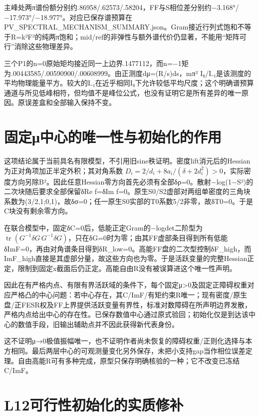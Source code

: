 \documentclass[
  10pt,
  a4paper,
]{article}
\begin{document}
主峰处两π谱份额分别约.86958/.62573/.58204，FF与S相位差分别约−3.168°/−17.973°/−18.977°。对应已保存谱预算在PV\_SPECTRAL\_MECHANISM\_SUMMARY.json。Gram接近行列式饱和不等于R=k²\textbar F\textbar²的纯两π饱和；mid/ref的非弹性与额外谱代价仍显著，不能用``矩阵可行''消除这些物理差异。

三个P1的n=0原始矩均接近同一上边界.1477112，而n=−1矩为.00443585/.00590900/.00608999。由正测度dμ=(R/s)ds，mπ²
I₀/I₋₁是该测度的平均物理能量平方。较大的I₋₁在近乎相同I₀下允许较低平均尺度；这个明确谱预算通道与所见低峰相符，但均值不是峰位公式，也没有证明它是所有差异的唯一原因。原误差盒和全部输入保持不变。

\section{固定μ中心的唯一性与初始化的作用}\label{ux56faux5b9aux3bcux4e2dux5fc3ux7684ux552fux4e00ux6027ux4e0eux521dux59cbux5316ux7684ux4f5cux7528}

这项结论属于当前具名有限模型，不引用旧sine秩证明。密度lift消元后的Hessian为正对角项加正半定外积；其对角系数
\(D_i=2/d_i+8a_i/(\delta+2d_i^2)>0\)，实际密度方向另除B²。因此任意Hessian零方向首先必须有全部δρ=0。散射−log(1−\textbar S\textbar²)的二次块随后要求全部保留δRe
f=δIm
f=0。原生S0/S2虚部对两组单密度的三角块系数为(3/2,1;0,1)，故δσ=0；任一原生S0实部的T0系数5/2非零，故δT0=0。于是C块没有剩余零方向。

在联合模型中，固定δC=0后，低能正定Gram的−logdet二阶型为\(\operatorname{tr}(G^{-1}\delta G\,G^{-1}\delta G)\)，只在δG=0时为零；由其FF虚部条目得到所有低能δImF=0，再由对角谱条目得到δR\_low=0。高能FF盘的二次型控制δF\_high，而ImF\_high直接是其虚部分量，故这些方向也为零。于是活跃变量的完整Hessian正定，限制到固定x截面后仍正定。高能自由R没有被误算进这个唯一性声明。

因此在有严格内点、有限有界活跃域的条件下，每个固定μ\textgreater0及固定正障碍权重对应严格凸的中心问题：若中心存在，其C/ImF/有矩约束R唯一；现有密度/原生盘/正FESR权及FF上界提供活跃变量有界性，标准对数障碍在所声明边界发散，严格内点给出中心的存在性。已保存数值中心通过原式验回；初始化仅是到达该中心的数值手段，旧输出辅助点并不因此获得新代表身份。

这不证明μ→0极值振幅唯一，也不证明作者尚未恢复的障碍权重/正则化选择与本方相同。最后两层中心的可观测量变化另外保存，未把小支持gap当作相位误差定理。自由高能R可有多种完成，原型只保存明确核验的一种；它不改变已冻结C/ImF。

\section{L12可行性初始化的实质修补}\label{l12ux53efux884cux6027ux521dux59cbux5316ux7684ux5b9eux8d28ux4feeux8865}
\end{document}
